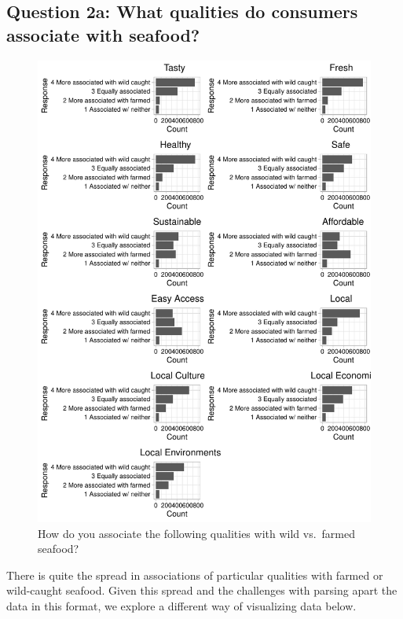 \documentclass[
  12pt,
]{article}
\begin{document}
\hypertarget{question-2a-what-qualities-do-consumers-associate-with-seafood}{%
\subsection{Question 2a: What qualities do consumers associate with
seafood?}\label{question-2a-what-qualities-do-consumers-associate-with-seafood}}

\begin{figure}
\centering
\includegraphics{Final_rmd_files/figure-latex/qualities-1.pdf}
\caption{How do you associate the following qualities with wild
vs.~farmed seafood?}
\end{figure}

There is quite the spread in associations of particular qualities with
farmed or wild-caught seafood. Given this spread and the challenges with
parsing apart the data in this format, we explore a different way of
visualizing data below.
\end{document}
